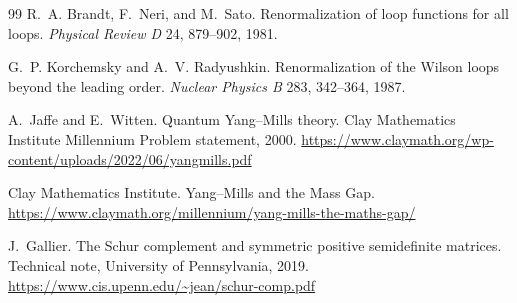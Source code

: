 \documentclass[11pt]{article}
\begin{document}
\begin{thebibliography}{99}
R.~A. Brandt, F.~Neri, and M.~Sato.
\newblock Renormalization of loop functions for all loops.
\newblock \emph{Physical Review D} 24, 879--902, 1981.

G.~P. Korchemsky and A.~V. Radyushkin.
\newblock Renormalization of the Wilson loops beyond the leading order.
\newblock \emph{Nuclear Physics B} 283, 342--364, 1987.

A.~Jaffe and E.~Witten.
\newblock Quantum Yang--Mills theory.
\newblock Clay Mathematics Institute Millennium Problem statement, 2000.
\newblock \url{https://www.claymath.org/wp-content/uploads/2022/06/yangmills.pdf}

Clay Mathematics Institute.
\newblock Yang--Mills and the Mass Gap.
\newblock \url{https://www.claymath.org/millennium/yang-mills-the-maths-gap/}

J.~Gallier.
\newblock The Schur complement and symmetric positive semidefinite matrices.
\newblock Technical note, University of Pennsylvania, 2019.
\newblock \url{https://www.cis.upenn.edu/~jean/schur-comp.pdf}

\end{thebibliography}
\end{document}
